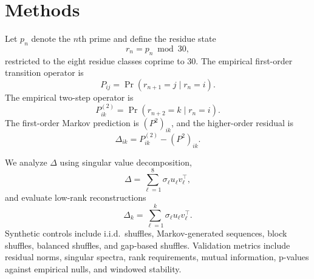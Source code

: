 \section{Methods}

Let $p_n$ denote the $n$th prime and define the residue state
\[
r_n = p_n \bmod 30,
\]
restricted to the eight residue classes coprime to $30$. The empirical first-order transition operator is
\[
P_{ij}=\Pr(r_{n+1}=j\mid r_n=i).
\]
The empirical two-step operator is
\[
P^{(2)}_{ik}=\Pr(r_{n+2}=k\mid r_n=i).
\]
The first-order Markov prediction is $(P^2)_{ik}$, and the higher-order residual is
\[
\Delta_{ik}=P^{(2)}_{ik}-(P^2)_{ik}.
\]

We analyze $\Delta$ using singular value decomposition,
\[
\Delta=\sum_{\ell=1}^{8}\sigma_\ell u_\ell v_\ell^\top,
\]
and evaluate low-rank reconstructions
\[
\Delta_k=\sum_{\ell=1}^{k}\sigma_\ell u_\ell v_\ell^\top.
\]
Synthetic controls include i.i.d.\ shuffles, Markov-generated sequences, block shuffles, balanced shuffles, and gap-based shuffles. Validation metrics include residual norms, singular spectra, rank requirements, mutual information, p-values against empirical nulls, and windowed stability.
